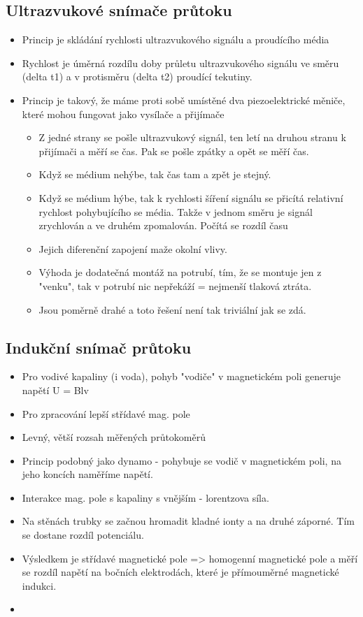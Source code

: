 \subsection*{Ultrazvukové snímače průtoku}
\begin{itemize}
    \item Princip je skládání rychlosti ultrazvukového signálu a proudícího média
    \item Rychlost je úměrná rozdílu doby průletu ultrazvukového signálu ve směru (delta t1) a v protisměru (delta t2) proudící tekutiny.
    \item Princip je takový, že máme proti sobě umístěné dva piezoelektrické měniče, které mohou fungovat jako vysílače a přijímače \begin{itemize}
              \item Z jedné strany se pošle ultrazvukový signál, ten letí na druhou stranu k přijímači a měří se čas. Pak se pošle zpátky a opět se měří čas.
              \item Když se médium nehýbe, tak čas tam a zpět je stejný.
              \item Když se médium hýbe, tak k rychlosti šíření signálu se přicítá relativní rychlost pohybujícího se média. Takže v jednom směru je signál zrychlován a ve druhém zpomalován. Počítá se rozdíl času
              \item Jejich diferenční zapojení maže okolní vlivy.
              \item Výhoda je dodatečná montáž na potrubí, tím, že se montuje jen z "venku", tak v potrubí nic nepřekáží = nejmenší tlaková ztráta.
              \item Jsou poměrně drahé a toto řešení není tak triviální jak se zdá.
          \end{itemize}
\end{itemize}

\subsection*{Indukční snímač průtoku}
\begin{itemize}
    \item Pro vodivé kapaliny (i voda), pohyb "vodiče" v magnetickém poli generuje napětí U = Blv
    \item Pro zpracování lepší střídavé mag. pole
    \item Levný, větší rozsah měřených průtokoměrů
    \item Princip podobný jako dynamo - pohybuje se vodič v magnetickém poli, na jeho koncích naměříme napětí.
    \item Interakce mag. pole s kapaliny s vnějším - lorentzova síla.
    \item Na stěnách trubky se začnou hromadit kladné ionty a na druhé záporné. Tím se dostane rozdíl potenciálu.
    \item Výsledkem je střídavé magnetické pole => homogenní magnetické pole a měří se rozdíl napětí na bočních elektrodách, které je přímouměrné magnetické indukci.
    \item
\end{itemize}

